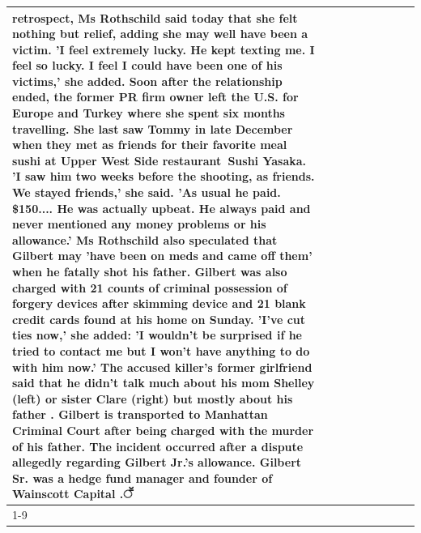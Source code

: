 \begin{table}[H]
\begin{tabular}{lllrlllll}
retrospect, Ms Rothschild said today that she felt nothing but relief, adding she may well have been a victim. 'I feel extremely lucky. He kept texting me. I feel so lucky. I feel I could have been one of his victims,' she added. Soon after the relationship ended, the former PR firm owner left the U.S. for Europe and Turkey where she spent six months  travelling. She last saw Tommy in late December when they met as friends for their favorite meal sushi at Upper West Side restaurant Sushi Yasaka. 'I saw him two weeks before the shooting, as friends. We stayed friends,' she said. 'As usual he paid. \$150.... He was actually upbeat. He always paid and never mentioned any money problems or his allowance.' Ms Rothschild also speculated that Gilbert may 'have been on meds and came off them' when he fatally shot his father. Gilbert was also charged with 21 counts of criminal possession of forgery devices after skimming device and 21 blank credit cards found at his home on Sunday. 'I've cut ties now,' she added: 'I wouldn’t be surprised if he tried to contact me but I won’t have anything to do with him now.' The accused killer's former girlfriend said that he didn't talk much about his mom Shelley (left) or sister Clare (right) but mostly about his father . Gilbert is transported to Manhattan Criminal Court  after being charged with the murder of his father. The incident occurred after a dispute allegedly regarding Gilbert Jr.'s allowance. Gilbert Sr. was a hedge fund manager and founder of Wainscott Capital .ॕ \\
\cline{1-9}

\end{tabular}
\end{table}
